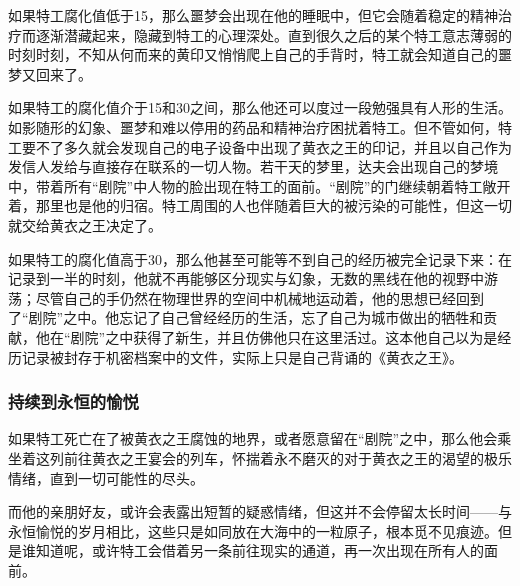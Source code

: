 如果特工腐化值低于15，那么噩梦会出现在他的睡眠中，但它会随着稳定的精神治疗而逐渐潜藏起来，隐藏到特工的心理深处。直到很久之后的某个特工意志薄弱的时刻时刻，不知从何而来的黄印又悄悄爬上自己的手背时，特工就会知道自己的噩梦又回来了。

如果特工的腐化值介于15和30之间，那么他还可以度过一段勉强具有人形的生活。如影随形的幻象、噩梦和难以停用的药品和精神治疗困扰着特工。但不管如何，特工要不了多久就会发现自己的电子设备中出现了黄衣之王的印记，并且以自己作为发信人发给与直接存在联系的一切人物。若干天的梦里，达夫会出现自己的梦境中，带着所有“剧院”中人物的脸出现在特工的面前。“剧院”的门继续朝着特工敞开着，那里也是他的归宿。特工周围的人也伴随着巨大的被污染的可能性，但这一切就交给黄衣之王决定了。

如果特工的腐化值高于30，那么他甚至可能等不到自己的经历被完全记录下来：在记录到一半的时刻，他就不再能够区分现实与幻象，无数的黑线在他的视野中游荡；尽管自己的手仍然在物理世界的空间中机械地运动着，他的思想已经回到了“剧院”之中。他忘记了自己曾经经历的生活，忘了自己为城市做出的牺牲和贡献，他在“剧院”之中获得了新生，并且仿佛他只在这里活过。这本他自己以为是经历记录被封存于机密档案中的文件，实际上只是自己背诵的《黄衣之王》。

\subsubsection{持续到永恒的愉悦}

如果特工死亡在了被黄衣之王腐蚀的地界，或者愿意留在“剧院”之中，那么他会乘坐着这列前往黄衣之王宴会的列车，怀揣着永不磨灭的对于黄衣之王的渴望的极乐情绪，直到一切可能性的尽头。

而他的亲朋好友，或许会表露出短暂的疑惑情绪，但这并不会停留太长时间——与永恒愉悦的岁月相比，这些只是如同放在大海中的一粒原子，根本觅不见痕迹。但是谁知道呢，或许特工会借着另一条前往现实的通道，再一次出现在所有人的面前。
